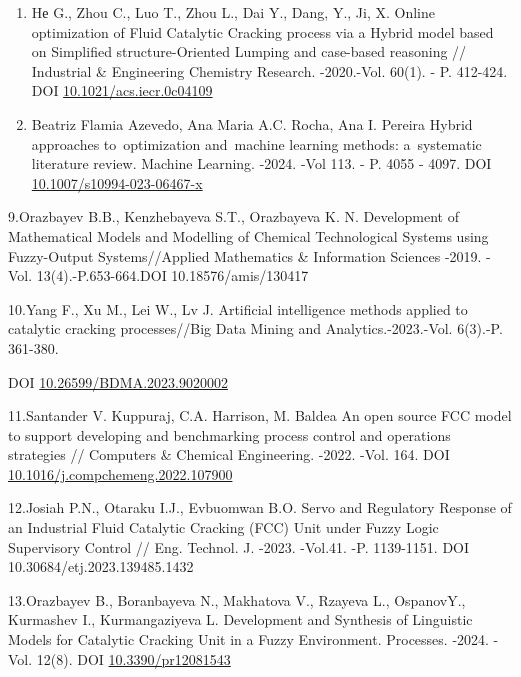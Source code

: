 \begin{references}
\begin{enumerate}
\def\labelenumi{\arabic{enumi}.}
\setcounter{enumi}{6}
\item
  Hе G., Zhou C., Luo T., Zhou L., Dai Y., Dang, Y., Ji, X. Online
  optimization of Fluid Catalytic Cracking process via a Hybrid model
  based on Simplified structure-Oriented Lumping and case-based
  reasoning // Industrial \& Engineering Chemistry Research. -2020.-Vol.
  60(1). - P. 412-424. DOI
  \href{http://dx.doi.org/10.1021/acs.iecr.0c04109}{10.1021/acs.iecr.0c04109}
\item
  Beatriz Flamia Azevedo, Ana Maria A.C. Rocha, Ana I. Pereira Hybrid
  approaches to~optimization and~machine learning methods: a~systematic
  literature review. Machine Learning. -2024. -Vol 113. - P. 4055 -
  4097. DOI
  \href{http://dx.doi.org/10.1007/s10994-023-06467-x}{10.1007/s10994-023-06467-x}
\end{enumerate}

9.Orazbayev B.B., Kenzhebayeva S.T., Orazbayeva K. N. Development of
Mathematical Models and Modelling of Chemical Technological Systems
using Fuzzy-Output Systems//Applied Mathematics \& Information Sciences
-2019. -Vol. 13(4).-P.653-664.DOI 10.18576/amis/130417

10.Yang F., Xu M., Lei W., Lv J. Artificial intelligence methods applied
to catalytic cracking processes//Big Data Mining and
Analytics.-2023.-Vol. 6(3).-P. 361-380.

DOI
\href{http://dx.doi.org/10.26599/BDMA.2023.9020002}{10.26599/BDMA.2023.9020002}

11.Santander V. Kuppuraj, C.A. Harrison, M. Baldea An open source FCC
model to support developing and benchmarking process control and
operations strategies // Computers \& Chemical Engineering. -2022. -Vol.
164. DOI
\href{https://doi.org/10.1016/j.compchemeng.2022.107900}{10.1016/j.compchemeng.2022.107900}

12.Josiah P.N., Otaraku I.J., Evbuomwan B.O. Servo and Regulatory
Response of an Industrial Fluid Catalytic Cracking (FCC) Unit under
Fuzzy Logic Supervisory Control // Eng. Technol. J. -2023. -Vol.41. -P.
1139-1151. DOI 10.30684/etj.2023.139485.1432

13.Orazbayev B., Boranbayeva N., Makhatova V., Rzayeva L., OspanovY.,
Kurmashev I., Kurmangaziyeva L. Development and Synthesis of Linguistic
Models for Catalytic Cracking Unit in a Fuzzy Environment. Processes.
-2024. -Vol. 12(8). DOI
\href{https://doi.org/10.3390/pr12081543}{10.3390/pr12081543}


\end{references}

